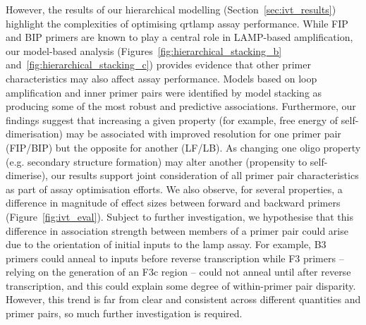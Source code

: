 \documentclass[../thesis.tex]{subfiles}
\begin{document}
However, the results of our hierarchical modelling (Section~\ref{sec:ivt_results}) highlight the complexities of optimising \gls{qrtlamp} assay performance. While FIP and BIP primers are known to play a central role in LAMP-based amplification, our model-based analysis (Figures~\ref{fig:hierarchical_stacking_b} and~\ref{fig:hierarchical_stacking_c}) provides evidence that other primer characteristics may also affect assay performance. Models based on loop amplification and inner primer pairs were identified by model stacking as producing some of the most robust and predictive associations. Furthermore, our findings suggest that increasing a given property (for example, free energy of self-dimerisation) may be associated with improved resolution for one primer pair (FIP/BIP) but the opposite for another (LF/LB). As changing one oligo property (e.g. secondary structure formation) may alter another (propensity to self-dimerise), our results support joint consideration of all primer pair characteristics as part of assay optimisation efforts. %
We also observe, for several properties, a difference in 
magnitude %
of effect sizes between forward and backward primers (Figure~\ref{fig:ivt_eval}). Subject to further investigation, we hypothesise that this difference in 
association strength %
between members of a primer pair could arise due to the orientation of initial  inputs to the \gls{lamp} assay. For example, B3 primers could anneal to  inputs before reverse transcription while F3 primers -- relying on the generation of an F3c region -- could not anneal until after reverse transcription, and this could explain some degree of within-primer pair disparity. However, this trend is far from clear and consistent across different quantities and primer pairs, so much further investigation is required.
\end{document}
